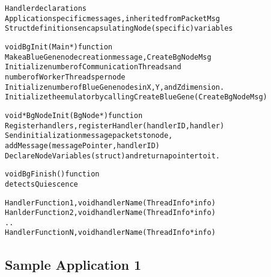 \documentclass[10pt]{article}
\begin{document}
\begin{alltt}
Handler declarations
Application specific messages, inherited from PacketMsg
Struct definitions encapsulating Node (specific) variables

void  BgInit(Main *)  function
  Make a Blue Gene node creation message, CreateBgNodeMsg
  Initialize number of Communication Threads and 
    number of Worker Threads per node
  Initialize number of Blue Gene nodes in X, Y, and Z dimension.
  Initialize the emulator by calling CreateBlueGene(CreateBgNodeMsg)

void *BgNodeInit(BgNode *) function
  Register handlers, registerHandler(handlerID, handler)
  Send initialization message packets to node, 
    addMessage(messagePointer, handlerID)
  Declare Node Variables (struct) and return a pointer to it.

void  BgFinish()  function
  detects Quiescence

Handler Function 1, void handlerName(ThreadInfo *info)
Hanlder Function 2, void handlerName(ThreadInfo *info)
..
Handler Function N, void handlerName(ThreadInfo *info)

\end{alltt}

\subsection{Sample Application 1}
\end{document}
